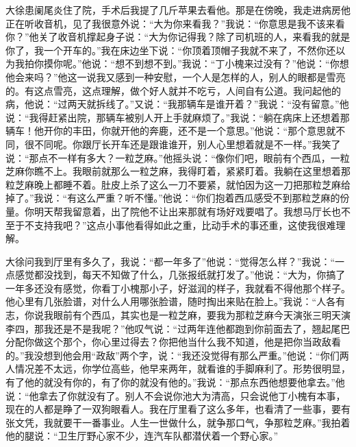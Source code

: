 \documentclass[12pt,oneside]{book}
\begin{document}
大徐患阑尾炎住了院，手术后我提了几斤苹果去看他。那是在傍晚，我走进病房他正在听收音机，见了我很意外说：``大为你来看我？''我说：``你意思是我不该来看你？''他关了收音机撑起身子说：``大为你记得我？除了司机班的人，来看我的就是你了，我一个开车的。''我在床边坐下说：``你顶着顶帽子我就不来了，不然你还以为我拍你摸你呢。''他说：``想不到想不到。''我说：``丁小槐来过没有？''他说：``你想他会来吗？''他这一说我又感到一种安慰，一个人是怎样的人，别人的眼都是雪亮的。有这点雪亮，这点理解，做个好人就并不吃亏，人间自有公道。我问起他的病，他说：``过两天就拆线了。''又说：``我那辆车是谁开着？''我说：``没有留意。''他说：``我得赶紧出院，那辆车被别人开上手就麻烦了。''我说：``躺在病床上还想着那辆车！他开你的丰田，你就开他的奔鹿，还不是一个意思。''他说：``那个意思就不同，很不同呢。你跟厅长开车还是跟谁谁开，别人心里想着就是不一样。''我笑了说：``那点不一样有多大？一粒芝麻。''他摇头说：``像你们吧，眼前有个西瓜，一粒芝麻你瞧不上。我眼前就那么一粒芝麻，我得盯着，紧紧盯着。我躺在这里想着那粒芝麻晚上都睡不着。肚皮上杀了这么一刀不要紧，就怕因为这一刀把那粒芝麻给掉了。''我说：``有这么严重？听不懂。''他说：``你们抱着西瓜感受不到那粒芝麻的份量。你明天帮我留意着，出了院他不让出来那就有场好戏要唱了。我想马厅长也不至于不支持我吧？''这点小事他看得如此之重，比动手术的事还重，这使我很难理解。

大徐问我到厅里有多久了，我说：``都一年多了''他说：``觉得怎么样？''我说：``一点感觉都没找到，每天不知做了什么，几张报纸就打发了。''他说：``大为，你搞了一年多还没有感觉，你看丁小槐那小子，好滋润的样子，我就看不得他那个样子。他心里有几张脸谱，对什么人用哪张脸谱，随时掏出来贴在脸上。''我说：``人各有志，你说我眼前有个西瓜，其实也是一粒芝麻，要我为那粒芝麻今天演张三明天演李四，那我还是不是我呢？''他叹气说：``过两年连他都跑到你前面去了，翘起尾巴分配你做这个那个，你心里过得去？你把他当什么我不知道，他是把你当政敌看的。''我没想到他会用``政敌''两个字，说：``我还没觉得有那么严重。''他说：``你们两人情况差不太远，你学位高些，他早来两年，就看谁的手脚麻利了。形势很明显，有了他的就没有你的，有了你的就没有他的。''我说：``那点东西他想要他拿去。''他说：``他拿去了你就没有了。别人不会说你池大为清高，只会说他丁小槐有本事，现在的人都是睁了一双狗眼看人。我在厅里看了这么多年，也看清了一些事，要有张文凭，我就要干一番事业。人生一世做什么，就争那口气，争那粒芝麻。''我拍着他的腿说：``卫生厅野心家不少，连汽车队都潜伏着一个野心家。''
\end{document}
